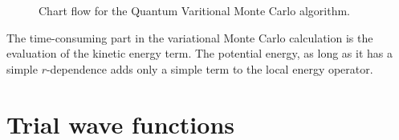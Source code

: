 \begin{figure}
\begin{centering}
\caption{Chart flow for the Quantum Varitional Monte Carlo algorithm.}\label{chartFlowMA}
\end{centering}
\end{figure}

\noindent
The time-consuming part in the variational Monte Carlo calculation is
the evaluation of the kinetic energy term.
The potential energy, as long as it has a simple $r$-dependence adds only a simple
term to the local energy operator.\\


\section{Trial wave functions}

